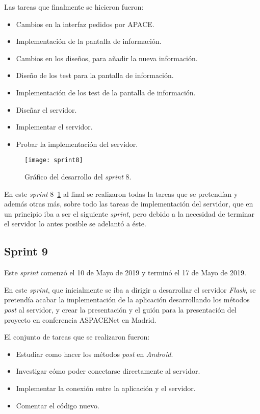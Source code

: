 Las tareas que finalmente se hicieron fueron:
\begin{itemize}
	\item Cambios en la interfaz pedidos por APACE.
	\item Implementación de la pantalla de información.
	\item Cambios en los diseños, para añadir la nueva información.
	\item Diseño de los test para la pantalla de información.
	\item Implementación de los test de la pantalla de información.
	\item Diseñar el servidor.
	\item Implementar el servidor.
	\item Probar la implementación del servidor.
\end{itemize}

\begin{figure}
	\centering
	\texttt{[image: sprint8]}
	\caption{Gráfico del desarrollo del \textit{sprint} 8.}
	\label{fig:sprint8}
\end{figure}

En este \textit{sprint} 8~\ref{fig:sprint8} al final se realizaron todas la tareas que se pretendían y además otras más, sobre todo las tareas de implementación del servidor, que en un principio iba a ser el siguiente \textit{sprint}, pero debido a la necesidad de terminar el servidor lo antes posible se adelantó a éste.

\subsection{Sprint 9}
Este \textit{sprint} comenzó el 10 de Mayo de 2019 y terminó el 17 de Mayo de 2019.

En este \textit{sprint}, que inicialmente se iba a dirigir a desarrollar el servidor \textit{Flask}, se pretendía acabar la implementación de la aplicación desarrollando los métodos \textit{post} al servidor, y crear la presentación y el guión para la presentación del proyecto en conferencia ASPACENet en Madrid.

El conjunto de tareas que se realizaron fueron:
\begin{itemize}
	\item Estudiar como hacer los métodos \textit{post} en \textit{Android}.
	\item Investigar cómo poder conectarse directamente al servidor.
	\item Implementar la conexión entre la aplicación y el servidor.
	\item Comentar el código nuevo.
\end{itemize}

